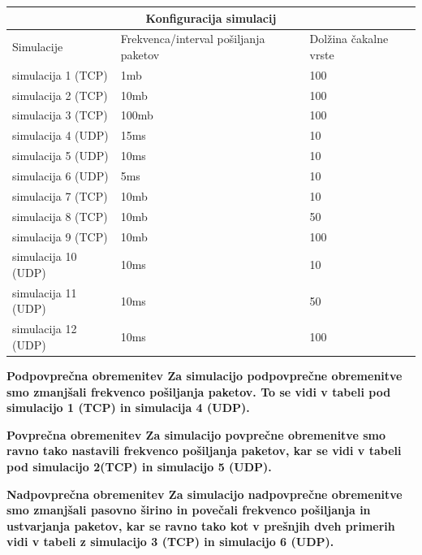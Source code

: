 \documentclass[11pt, a4paper, slovene]{book}
\begin{document}
\begin{tabular}{|p{3cm}||p{3cm}|p{3cm}|}
	\hline
	\multicolumn{3}{|c|}{Konfiguracija simulacij} \\
	\hline
	Simulacije& Frekvenca/interval pošiljanja paketov& Dolžina čakalne vrste \\
	\hline 
	simulacija 1 (TCP)& 1mb & 100\\
	\hline 
	simulacija 2 (TCP)& 10mb & 100\\
	\hline 
	simulacija 3 (TCP)& 100mb & 100\\
	\hline 	
	simulacija 4 (UDP)& 15ms & 10\\
	\hline 
	simulacija 5 (UDP)& 10ms & 10\\
	\hline 
	simulacija 6 (UDP)& 5ms & 10\\
	\hline 
	simulacija 7 (TCP)& 10mb &	10\\
	\hline 
	simulacija 8 (TCP)& 10mb & 50\\
	\hline
	simulacija 9 (TCP)& 10mb & 100\\
	\hline
	simulacija 10 (UDP)& 10ms & 10\\
	\hline
	simulacija 11 (UDP)& 10ms & 50\\
	\hline
	simulacija 12 (UDP)& 10ms & 100\\
	\hline
\end{tabular} 

\large \bf Podpovprečna obremenitev 
\normalfont \normalsize
Za simulacijo podpovprečne obremenitve smo zmanjšali frekvenco pošiljanja paketov. To se vidi v tabeli pod
simulacijo 1 (TCP) in simulacija 4 (UDP). 

\large \bf Povprečna obremenitev 
\normalfont \normalsize
Za simulacijo povprečne obremenitve smo ravno tako nastavili frekvenco pošiljanja paketov, kar se vidi v tabeli pod simulacijo 2(TCP) in simulacijo 5 (UDP). 

\large \bf Nadpovprečna obremenitev 
\normalfont \normalsize
Za simulacijo nadpovprečne obremenitve smo zmanjšali pasovno širino in povečali frekvenco pošiljanja in ustvarjanja paketov, kar se ravno tako kot v prešnjih dveh primerih vidi v tabeli z simulacijo 3 (TCP) in simulacijo 6 (UDP).
\end{document}

